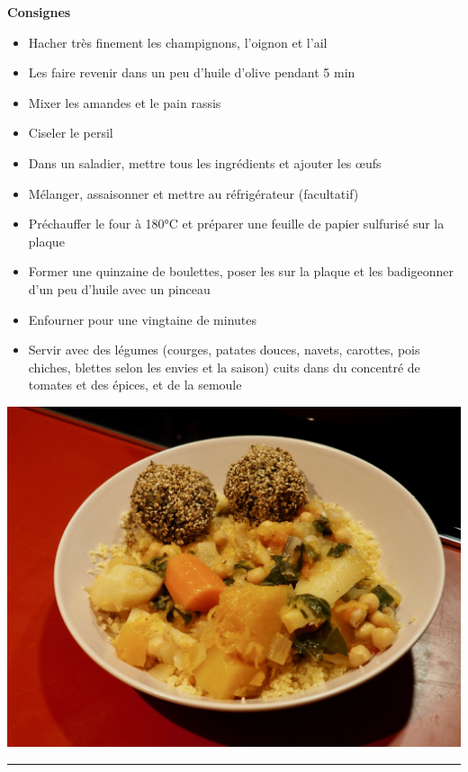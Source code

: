 \documentclass[]{book}
\providecommand{\tightlist}{%
  \setlength{\itemsep}{0pt}\setlength{\parskip}{0pt}}
\begin{document}
\textbf{Consignes}

\begin{itemize}
\tightlist
\item
  Hacher très finement les champignons, l'oignon et l'ail
\item
  Les faire revenir dans un peu d'huile d'olive pendant 5 min
\item
  Mixer les amandes et le pain rassis
\item
  Ciseler le persil
\item
  Dans un saladier, mettre tous les ingrédients et ajouter les œufs
\item
  Mélanger, assaisonner et mettre au réfrigérateur (facultatif)
\item
  Préchauffer le four à 180°C et préparer une feuille de papier
  sulfurisé sur la plaque
\item
  Former une quinzaine de boulettes, poser les sur la plaque et les
  badigeonner d'un peu d'huile avec un pinceau
\item
  Enfourner pour une vingtaine de minutes
\item
  Servir avec des légumes (courges, patates douces, navets, carottes,
  pois chiches, blettes selon les envies et la saison) cuits dans du
  concentré de tomates et des épices, et de la semoule
\end{itemize}

\begin{center}\includegraphics[width=0.9\linewidth]{photos/couscous} \end{center}

\begin{center}\rule{0.5\linewidth}{0.5pt}\end{center}
\end{document}
